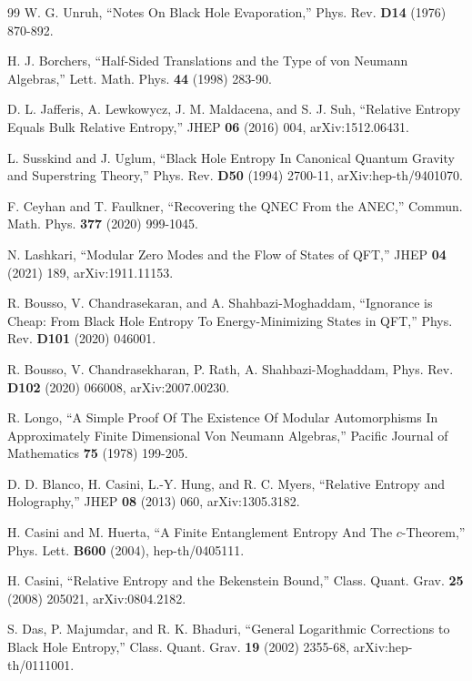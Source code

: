 \documentclass[11pt,a4paper]{article}
\def\S{{\sf S}}
\begin{document}
\begin{thebibliography}{99}
W. G. Unruh, ``Notes On Black Hole Evaporation,'' Phys. Rev. {\bf D14} (1976) 870-892.


H. J. Borchers, ``Half-Sided Translations and the Type of von Neumann Algebras,'' Lett. Math. Phys. {\bf 44} (1998) 283-90.

D. L. Jafferis, A. Lewkowycz, J. M. Maldacena, and S. J. Suh, ``Relative
Entropy Equals Bulk Relative Entropy,'' JHEP {\bf 06} (2016) 004, arXiv:1512.06431.

L. Susskind and J. Uglum, ``Black Hole Entropy In Canonical Quantum Gravity and Superstring Theory,'' 
Phys. Rev. {\bf D50} (1994)  2700-11,
arXiv:hep-th/9401070.

F. Ceyhan and T. Faulkner, ``Recovering the QNEC From the ANEC,''
Commun. Math. Phys. {\bf 377} (2020) 999-1045.

N. Lashkari, ``Modular Zero Modes and the Flow of States of QFT,''
JHEP {\bf 04} (2021) 189, arXiv:1911.11153.

R. Bousso, V. Chandrasekaran, and A. Shahbazi-Moghaddam, ``Ignorance is Cheap: From Black Hole Entropy To Energy-Minimizing
States in QFT,'' Phys. Rev. {\bf D101} (2020) 046001.

R. Bousso, V. Chandrasekharan, P. Rath, A. Shahbazi-Moghaddam, 
Phys. Rev. {\bf D102} (2020) 066008, arXiv:2007.00230.

R. Longo, ``A Simple Proof Of The Existence Of Modular Automorphisms 
In Approximately Finite Dimensional Von Neumann Algebras,'' Pacific Journal of Mathematics {\bf 75} (1978) 199-205.

D. D. Blanco, H. Casini, L.-Y. Hung, and R. C. Myers, ``Relative Entropy and Holography,'' JHEP {\bf 08} (2013) 060, arXiv:1305.3182.

H. Casini and M. Huerta, ``A Finite Entanglement Entropy And The $c$-Theorem,'' Phys. Lett. {\bf B600} (2004),
hep-th/0405111.

H. Casini,
``Relative Entropy and the Bekenstein Bound,'' Class. Quant. Grav. {\bf 25} (2008) 205021, arXiv:0804.2182.


S. Das, P. Majumdar, and R. K. Bhaduri,
``General Logarithmic Corrections to Black Hole Entropy,''  Class. Quant. Grav. {\bf 19} (2002) 2355-68,
arXiv:hep-th/0111001.

\end{thebibliography}
\end{document}
